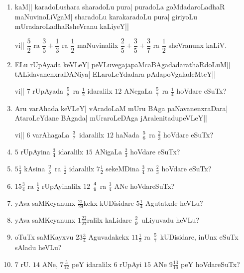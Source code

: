\begin{enumerate}[\rm(1)]
\item kaM|| karadoLushara sharadoLu pura| puradoLa goMdadaroLadhaR maNuvinoLiVgaM| sharadoLu karakaradoLu pura| giriyoLu mUradaroLadhaRsheVranu kaLiyeY||

vi|| $\dfrac{5}{2}$ ra $\dfrac{3}{5} + \dfrac{1}{3}$ ra $\dfrac{1}{2}$ maNuvinalilx $\dfrac{2}{5} + \dfrac{3}{5} + \dfrac{3}{7}$ ra $\dfrac{1}{2}$ sheVranunx kaLiV.

\item ELu rUpAyada keVLeY| peVLuvegajapaMcaBAgadadarathaRdoLuM|| tALidavanenxraDANiya| ELaroLeYdadara pAdapoVgaladeMteY||

vi|| $7$ rUpAyada ${5}\above 0pt {8}$ ra $\frac{1}{2}$ idaralilx $12$ ANegaLa ${5}\above 0pt {7}$ ra $\frac{1}{4}$ hoVdare eSuTx?

\item Aru varAhada keVLeY| vAradoLaM mUru BAga paNavanenxraDara| AtaroLeYdane BAgada| mUraroLeDAga jAralenitadupeVLeY||

vi|| $6$ varAhagaLa ${3}\above 0pt{7}$ idaralilx $12$ haNada ${5}\above 0pt{6}$ ra $\frac{2}{3}$ hoVdare eSuTx?

\item $5$ rUpAyina $\frac{3}{4}$ idaralilx $15$ ANigaLa $\frac{2}{3}$ hoVdare eSuTx?

\item $5\frac{1}{3}$ kAsina ${2}\above 0pt{5}$ ra $\frac{1}{2}$ idaralilx $7\frac{1}{2}$ sekeMDina $\frac{3}{4}$ ra $\frac{2}{3}$ hoVdare eSuTx?

\item $15\frac{3}{4}$ ra $\frac{1}{2}$ rUpAyinalilx $12$ ${4}\above 0pt{9}$ ra $\frac{3}{4}$ ANe hoVdareSuTx?

\item yAva saMKeyanunx $\frac{21}{29}$kekx kUDisidare $5\frac{1}{4}$ Agutatxde heVLu?

\item yAva saMKeyanunx $1\tfrac{22}{27}$ralilx kaLidare ${2}\above 0pt{9}$ uLiyuvadu heVLu?

\item oTuTx saMKayxvu $23\tfrac{3}{4}$ Aguvadakekx $11\tfrac{1}{2}$ ra ${5}\above 0pt{7}$ kUDisidare, inUnx eSuTx sAladu heVLu?

\item $7$ rU. $14$ ANe, $7\tfrac{5}{12}$ peY idaralilx $6$ rUpAyi $15$ ANe $9\tfrac{13}{16}$ peY hoVdareSuTx?
\end{enumerate}
